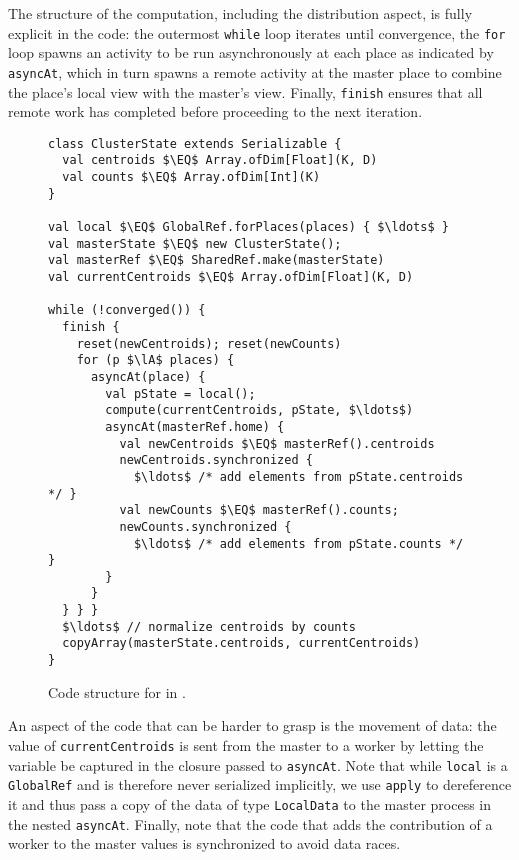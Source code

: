 The structure of the computation, including the distribution
aspect, is fully explicit in the code: the outermost \lstinline{while} loop
iterates until convergence, the \lstinline{for} loop spawns an activity to be run asynchronously at each place as indicated by \lstinline{asyncAt}, which in turn spawns a remote activity at the master place to combine the place's local view with the master's view.
Finally, \lstinline{finish} ensures that all remote work has completed before
proceeding to the next iteration.
\begin{figure}
\begin{lstlisting}
class ClusterState extends Serializable {
  val centroids $\EQ$ Array.ofDim[Float](K, D)
  val counts $\EQ$ Array.ofDim[Int](K)
}

val local $\EQ$ GlobalRef.forPlaces(places) { $\ldots$ }
val masterState $\EQ$ new ClusterState();
val masterRef $\EQ$ SharedRef.make(masterState)
val currentCentroids $\EQ$ Array.ofDim[Float](K, D)

while (!converged()) {
  finish {
    reset(newCentroids); reset(newCounts)
    for (p $\lA$ places) {
      asyncAt(place) {
        val pState = local();
        compute(currentCentroids, pState, $\ldots$)
        asyncAt(masterRef.home) {
          val newCentroids $\EQ$ masterRef().centroids
          newCentroids.synchronized {
            $\ldots$ /* add elements from pState.centroids */ }
          val newCounts $\EQ$ masterRef().counts;
          newCounts.synchronized {
            $\ldots$ /* add elements from pState.counts */ }
        }
      }
  } } }
  $\ldots$ // normalize centroids by counts
  copyArray(masterState.centroids, currentCentroids)
}
\end{lstlisting}
\caption{Code structure for \kmeans in \apgas.\label{fig:kmeansapgas}}
\end{figure}
An aspect of the code that can be harder to grasp is the movement of data: the
value of \lstinline{currentCentroids} is sent from the master to a worker by letting the variable be captured in the closure passed to \lstinline{asyncAt}.
Note that while \lstinline{local} is a
\lstinline{GlobalRef} and is therefore never serialized implicitly, we use
\lstinline{apply} to dereference it and thus pass a copy of the data of type
\lstinline{LocalData} to the master process in the nested \lstinline{asyncAt}.
Finally, note that the code that adds the contribution of a worker to the master values is synchronized to avoid data races.


